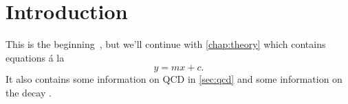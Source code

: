 \chapter{Introduction}
\label{chap:introduction}

This is the beginning~\cite{PDG2014}, but we'll continue with 
\cref{chap:theory} which contains equations \'a la
\begin{equation}
  y = mx + c.
  \label{eqn:foo}
\end{equation}
It also contains some information on \ac{QCD} in \cref{sec:qcd} and some 
information on the decay \decay{\PLambdac}{\Pproton\PKp\PKm}.

\lipsum[1-12]
